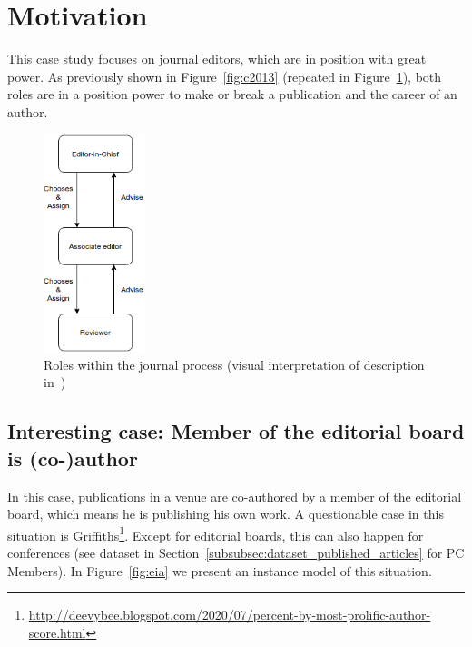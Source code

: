 \documentclass{ou-report}
\begin{document}
\section{Motivation}
This case study focuses on journal editors, which are in position with great 
power. As previously shown in Figure~\ref{fig:c2013} (repeated in Figure~\ref{fig:c2013_2}), both roles are in 
a position power to make or break a publication and the career of an author.

\begin{figure}[H]
\centering
\includegraphics[width=3cm]{images/c2013.drawio.png}
\caption{Roles within the journal process (visual interpretation of description in~\cite{C2013})}
\label{fig:c2013_2}
\end{figure}

\newpage

\subsection{Interesting case: Member of the editorial board is (co-)author}
\label{interesting_case:member_editorial_board_is_coauthor}

In this case, publications in a venue are co-authored by a member of the 
editorial board, which means he is publishing his own work. A questionable 
case in this situation is
\mbox{Griffiths}\footnote{\url{http://deevybee.blogspot.com/2020/07/percent-by-most-prolific-author-score.html}}.
Except for editorial boards, this can also happen for conferences (see 
dataset in Section~\ref{subsubsec:dataset_published_articles} for PC Members).
In Figure~\ref{fig:eia} we present an instance model of this situation.
\end{document}
